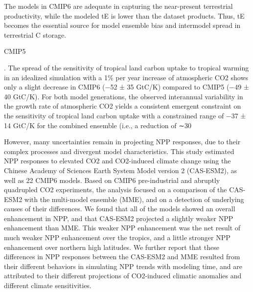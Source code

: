 \documentclass{article}
\begin{document}
The models in CMIP6 are adequate in capturing the near-present terrestrial productivity, while the modeled tE is lower than the dataset products. Thus, tE becomes the essential source for model ensemble bias and intermodel spread in terrestrial C storage.

\citep{Winkler2019} CMIP5

\citep{Zechlau2022}
. The spread of the sensitivity of tropical land carbon uptake to tropical
warming in an idealized simulation with a 1\% per year increase of atmospheric CO2 shows only a slight decrease in CMIP6 (−52 ± 35 GtC/K) compared to CMIP5 (−49 ± 40 GtC/K). For both model generations, the observed interannual variability in the growth rate of atmospheric CO2 yields a consistent emergent constraint on the sensitivity of tropical land carbon uptake with a constrained range of −37 ± 14 GtC/K for the combined ensemble (i.e., a reduction of ∼30%

\citep{Zhu2022}
However, many uncertainties remain in projecting NPP responses, due to their complex processes and divergent model characteristics. This study estimated NPP responses to elevated CO2 and CO2-induced climate change using the Chinese Academy of Sciences Earth System Model version 2 (CAS-ESM2), as well as 22 CMIP6 models. Based on CMIP6 pre-industrial and abruptly quadrupled CO2 experiments, the analysis focused on a comparison of the CAS-ESM2 with the multi-model ensemble (MME), and on a detection of underlying causes of their differences. We found that all of the models showed an overall enhancement in NPP, and that CAS-ESM2 projected a slightly weaker NPP enhancement than MME. This weaker NPP enhancement was the net result of much weaker NPP enhancement over the tropics, and a little stronger NPP enhancement over northern high latitudes. We further report that these differences in NPP responses between the CAS-ESM2 and MME resulted from their different behaviors in simulating NPP trends with modeling time, and are attributed to their different projections of CO2-induced climatic anomalies and different climate sensitivities.


\end{document}
